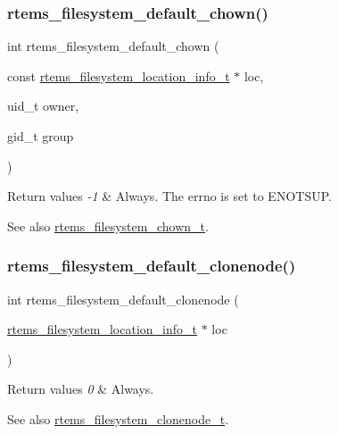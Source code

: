 \subsubsection{\texorpdfstring{rtems\_filesystem\_default\_chown()}{rtems\_filesystem\_default\_chown()}}
{\footnotesize\ttfamily int rtems\+\_\+filesystem\+\_\+default\+\_\+chown (\begin{DoxyParamCaption}\item[{const \mbox{\hyperlink{group__LibIO_ga3252b3d31ee3c49ffff0b7604a676864}{rtems\+\_\+filesystem\+\_\+location\+\_\+info\+\_\+t}} $\ast$}]{loc,  }\item[{uid\+\_\+t}]{owner,  }\item[{gid\+\_\+t}]{group }\end{DoxyParamCaption})}


\begin{DoxyRetVals}{Return values}
{\em -\/1} & Always. The errno is set to E\+N\+O\+T\+S\+UP.\\
\hline
\end{DoxyRetVals}
\begin{DoxySeeAlso}{See also}
\mbox{\hyperlink{group__LibIOFSOps_gad7040c3142badcd374418462276f977a}{rtems\+\_\+filesystem\+\_\+chown\+\_\+t}}. 
\end{DoxySeeAlso}
\mbox{\label{group__LibIOFSOps_ga50dd6f2187a5ce3f918b18548df6e9eb}} 
\subsubsection{\texorpdfstring{rtems\_filesystem\_default\_clonenode()}{rtems\_filesystem\_default\_clonenode()}}
{\footnotesize\ttfamily int rtems\+\_\+filesystem\+\_\+default\+\_\+clonenode (\begin{DoxyParamCaption}\item[{\mbox{\hyperlink{group__LibIO_ga3252b3d31ee3c49ffff0b7604a676864}{rtems\+\_\+filesystem\+\_\+location\+\_\+info\+\_\+t}} $\ast$}]{loc }\end{DoxyParamCaption})}


\begin{DoxyRetVals}{Return values}
{\em 0} & Always.\\
\hline
\end{DoxyRetVals}
\begin{DoxySeeAlso}{See also}
\mbox{\hyperlink{group__LibIOFSOps_ga7ff510a002e57b7165b331e4c2f21a10}{rtems\+\_\+filesystem\+\_\+clonenode\+\_\+t}}. 
\end{DoxySeeAlso}
\mbox{\label{group__LibIOFSOps_gaa070ca99adbec30122412347ccc634e7}} 
